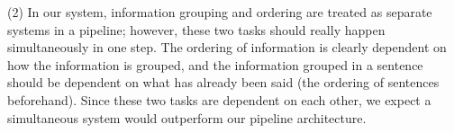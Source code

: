 \documentclass[12pt]{article}
\begin{document}
(2) In our system, information grouping and ordering are treated as separate systems in a pipeline; however, these two tasks should really happen simultaneously in one step. The ordering of information is clearly dependent on how the information is grouped, and the information grouped in a sentence should be dependent on what has already been said (the ordering of sentences beforehand). Since these two tasks are dependent on each other, we expect a simultaneous system would outperform our pipeline architecture.


\pagebreak


\end{document}
